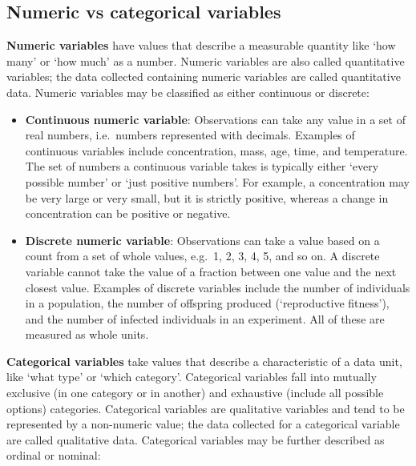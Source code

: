 \documentclass[
]{book}
\begin{document}
\hypertarget{numeric-vs-categorical-variables}{%
\subsection{Numeric vs categorical variables}\label{numeric-vs-categorical-variables}}

\textbf{Numeric variables} have values that describe a measurable quantity like `how many' or `how much' as a number. Numeric variables are also called quantitative variables; the data collected containing numeric variables are called quantitative data. Numeric variables may be classified as either continuous or discrete:

\begin{itemize}
\item
  \textbf{Continuous numeric variable}: Observations can take any value in a set of real numbers, i.e.~numbers represented with decimals. Examples of continuous variables include concentration, mass, age, time, and temperature. The set of numbers a continuous variable takes is typically either `every possible number' or `just positive numbers'. For example, a concentration may be very large or very small, but it is strictly positive, whereas a change in concentration can be positive or negative.
\item
  \textbf{Discrete numeric variable}: Observations can take a value based on a count from a set of whole values, e.g.~1, 2, 3, 4, 5, and so on. A discrete variable cannot take the value of a fraction between one value and the next closest value. Examples of discrete variables include the number of individuals in a population, the number of offspring produced (`reproductive fitness'), and the number of infected individuals in an experiment. All of these are measured as whole units.
\end{itemize}

\textbf{Categorical variables} take values that describe a characteristic of a data unit, like `what type' or `which category'. Categorical variables fall into mutually exclusive (in one category or in another) and exhaustive (include all possible options) categories. Categorical variables are qualitative variables and tend to be represented by a non-numeric value; the data collected for a categorical variable are called qualitative data. Categorical variables may be further described as ordinal or nominal:
\end{document}
